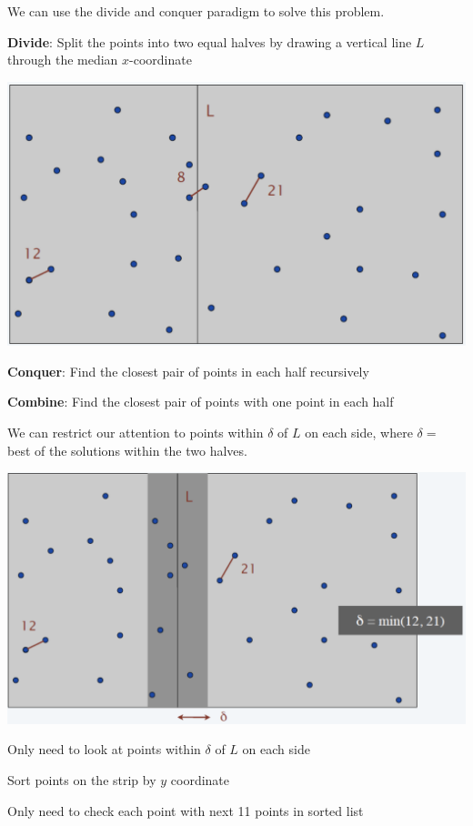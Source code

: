 We can use the divide and conquer paradigm to solve this problem.

\begin{listu}
    \item \textbf{Divide}: Split the points into two equal halves by drawing a vertical line $L$ through the median $x$-coordinate

    \begin{center} \includegraphics[width=0.5\linewidth]{figures/Closest Pair Divide.png} \end{center}

    \item \textbf{Conquer}: Find the closest pair of points in each half recursively

    \item \textbf{Combine}: Find the closest pair of points with one point in each half

    We can restrict our attention to points within $\delta$ of $L$ on each side, where $\delta = $ best of the solutions within the two halves. 

    \begin{center} \includegraphics[width=0.5\linewidth]{figures/Closest Pair Conquer.png} \end{center}

    \begin{listu}
        \item Only need to look at points within $\delta$ of $L$ on each side
        \item Sort points on the strip by $y$ coordinate
        \item Only need to check each point with next 11 points in sorted list
    \end{listu}


\end{listu}
